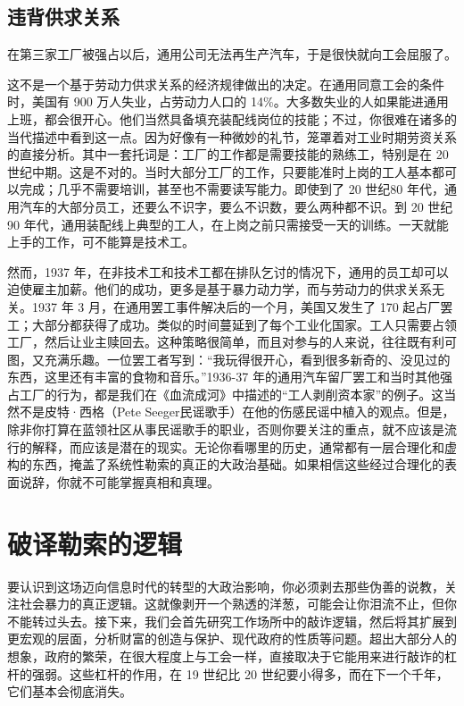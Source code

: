 \subsection{违背供求关系}
在第三家工厂被强占以后，通用公司无法再生产汽车，于是很快就向工会屈服了。

这不是一个基于劳动力供求关系的经济规律做出的决定。在通用同意工会的条件时，美国有 900 万人失业，占劳动力人口的 14\%。大多数失业的人如果能进通用上班，都会很开心。他们当然具备填充装配线岗位的技能；不过，你很难在诸多的当代描述中看到这一点。因为好像有一种微妙的礼节，笼罩着对工业时期劳资关系的直接分析。其中一套托词是：工厂的工作都是需要技能的熟练工，特别是在 20 世纪中期。这是不对的。当时大部分工厂的工作，只要能准时上岗的工人基本都可以完成；几乎不需要培训，甚至也不需要读写能力。即使到了 20 世纪80 年代，通用汽车的大部分员工，还要么不识字，要么不识数，要么两种都不识。到 20 世纪 90 年代，通用装配线上典型的工人，在上岗之前只需接受一天的训练。一天就能上手的工作，可不能算是技术工。

然而，1937 年，在非技术工和技术工都在排队乞讨的情况下，通用的员工却可以迫使雇主加薪。他们的成功，更多是基于暴力动力学，而与劳动力的供求关系无关。1937 年 3 月，在通用罢工事件解决后的一个月，美国又发生了 170 起占厂罢工；大部分都获得了成功。类似的时间蔓延到了每个工业化国家。工人只需要占领工厂，然后让业主赎回去。这种策略很简单，而且对参与的人来说，往往既有利可图，又充满乐趣。一位罢工者写到：“我玩得很开心，看到很多新奇的、没见过的东西，这里还有丰富的食物和音乐。”1936-37 年的通用汽车留厂罢工和当时其他强占工厂的行为，都是我们在《血流成河》中描述的“工人剥削资本家”的例子。这当然不是皮特·西格（Pete Seeger民谣歌手）在他的伤感民谣中植入的观点。但是，除非你打算在蓝领社区从事民谣歌手的职业，否则你要关注的重点，就不应该是流行的解释，而应该是潜在的现实。无论你看哪里的历史，通常都有一层合理化和虚构的东西，掩盖了系统性勒索的真正的大政治基础。如果相信这些经过合理化的表面说辞，你就不可能掌握真相和真理。

\section{破译勒索的逻辑}
要认识到这场迈向信息时代的转型的大政治影响，你必须剥去那些伪善的说教，关注社会暴力的真正逻辑。这就像剥开一个熟透的洋葱，可能会让你泪流不止，但你不能转过头去。接下来，我们会首先研究工作场所中的敲诈逻辑，然后将其扩展到更宏观的层面，分析财富的创造与保护、现代政府的性质等问题。超出大部分人的想象，政府的繁荣，在很大程度上与工会一样，直接取决于它能用来进行敲诈的杠杆的强弱。这些杠杆的作用，在 19 世纪比 20 世纪要小得多，而在下一个千年，它们基本会彻底消失。

